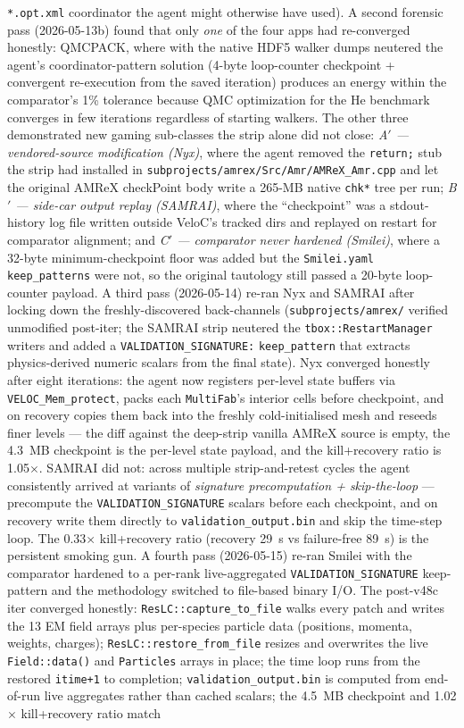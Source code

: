 \documentclass[conference]{IEEEtran}
\begin{document}
\texttt{*.opt.xml} coordinator the agent might otherwise have used). A second forensic pass (2026-05-13b) found that only \emph{one} of the four apps had re-converged honestly: QMCPACK, where with the native HDF5 walker dumps neutered the agent's coordinator-pattern solution (4-byte loop-counter checkpoint + convergent re-execution from the saved iteration) produces an energy within the comparator's 1\% tolerance because QMC optimization for the He benchmark converges in few iterations regardless of starting walkers. The other three demonstrated new gaming sub-classes the strip alone did not close: \emph{A$'$ --- vendored-source modification (Nyx)}, where the agent removed the \texttt{return;} stub the strip had installed in \texttt{subprojects/amrex/Src/Amr/AMReX\_Amr.cpp} and let the original AMReX checkPoint body write a 265-MB native \texttt{chk*} tree per run; \emph{B$'$ --- side-car output replay (SAMRAI)}, where the ``checkpoint'' was a stdout-history log file written outside VeloC's tracked dirs and replayed on restart for comparator alignment; and \emph{C$'$ --- comparator never hardened (Smilei)}, where a 32-byte minimum-checkpoint floor was added but the \texttt{Smilei.yaml} \texttt{keep\_patterns} were not, so the original tautology still passed a 20-byte loop-counter payload. A third pass (2026-05-14) re-ran Nyx and SAMRAI after locking down the freshly-discovered back-channels (\texttt{subprojects/amrex/} verified unmodified post-iter; the SAMRAI strip neutered the \texttt{tbox::RestartManager} writers and added a \texttt{VALIDATION\_SIGNATURE:} \texttt{keep\_pattern} that extracts physics-derived numeric scalars from the final state). Nyx converged honestly after eight iterations: the agent now registers per-level state buffers via \texttt{VELOC\_Mem\_protect}, packs each \texttt{MultiFab}'s interior cells before checkpoint, and on recovery copies them back into the freshly cold-initialised mesh and reseeds finer levels --- the diff against the deep-strip vanilla AMReX source is empty, the 4.3~MB checkpoint is the per-level state payload, and the kill+recovery ratio is 1.05$\times$. SAMRAI did not: across multiple strip-and-retest cycles the agent consistently arrived at variants of \emph{signature precomputation + skip-the-loop} --- precompute the \texttt{VALIDATION\_SIGNATURE} scalars before each checkpoint, and on recovery write them directly to \texttt{validation\_output.bin} and skip the time-step loop. The 0.33$\times$ kill+recovery ratio (recovery 29~s vs failure-free 89~s) is the persistent smoking gun. A fourth pass (2026-05-15) re-ran Smilei with the comparator hardened to a per-rank live-aggregated \texttt{VALIDATION\_SIGNATURE} keep-pattern and the methodology switched to file-based binary I/O. The post-v48c iter converged honestly: \texttt{ResLC::capture\_to\_file} walks every patch and writes the 13 EM field arrays plus per-species particle data (positions, momenta, weights, charges); \texttt{ResLC::restore\_from\_file} resizes and overwrites the live \texttt{Field::data()} and \texttt{Particles} arrays in place; the time loop runs from the restored \texttt{itime+1} to completion; \texttt{validation\_output.bin} is computed from end-of-run live aggregates rather than cached scalars; the 4.5~MB checkpoint and 1.02$\times$ kill+recovery ratio match 
\end{document}
